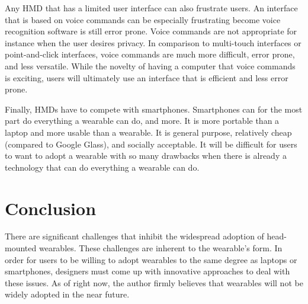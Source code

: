 \documentclass[11pt]{article}
\newcommand{\myreferences}{references}
\begin{document}
Any HMD that has a limited user interface can also frustrate users. An interface that is based on voice commands can be especially frustrating become voice recognition software is still error prone. Voice commands are not appropriate for instance when the user desires privacy. In comparison to multi-touch interfaces or point-and-click interfaces, voice commands are much more difficult, error prone, and less versatile. While the novelty of having a computer that voice commands is exciting, users will ultimately use an interface that is efficient and less error prone. 

Finally, HMDs have to compete with smartphones. Smartphones can for the most part do everything a wearable can do, and more. It is more portable than a laptop and more usable than a wearable. It is general purpose, relatively cheap (compared to Google Glass), and socially acceptable. It will be difficult for users to want to adopt a wearable with so many drawbacks when there is already a technology that can do everything a wearable can do.
 
\section{Conclusion}

There are significant challenges that inhibit the widespread adoption of head-mounted wearables. These challenges are inherent to the wearable's form. In order for users to be willing to adopt wearables to the same degree as laptops or smartphones, designers must come up with innovative approaches to deal with these issues. As of right now, the author firmly believes that wearables will not be widely adopted in the near future.



\end{document}
